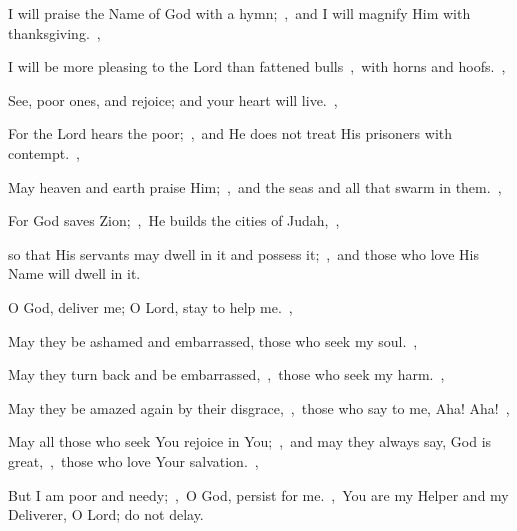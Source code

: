 \documentclass[12pt,twoside,a5paper]{article}
\begin{document}
\begin{normalparskip}
  I will praise the Name of God with a hymn;~\sep\ and I will magnify Him with thanksgiving.~\sep

  I will be more pleasing to the Lord than fattened bulls~\sep\ with horns and hoofs.~\sep

  See, poor ones, and rejoice; and your heart will live.~\sep

  For the Lord hears the poor;~\sep\ and He does not treat His prisoners with contempt.~\sep

  May heaven and earth praise Him;~\sep\ and the seas and all that swarm in them.~\sep

  For God saves Zion;~\sep\ He builds the cities of Judah,~\sep

  so that His servants may dwell in it and possess it;~\sep\ and those who love His Name will dwell in it.
\end{normalparskip}


\begin{normalparskip}
  O God, deliver me; O Lord, stay to help me.~\sep

  May they be ashamed and embarrassed, those who seek my soul.~\sep


  May they turn back and be embarrassed,~\sep\ those who seek my harm.~\sep

  May they be amazed again by their disgrace,~\sep\ those who say to me, Aha! Aha!~\sep

  May all those who seek You rejoice in You;~\sep\ and may they always say, God is great,~\sep\ those who love Your salvation.~\sep

  But I am poor and needy;~\sep\ O God, persist for me.~\sep\ You are my Helper and my Deliverer, O Lord; do not delay.
\end{normalparskip}



\end{document}
